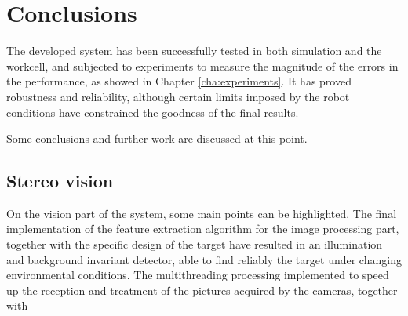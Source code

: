 
\chapter{Conclusions} %
\label{cha:conclusions}
The developed system has been successfully tested in both simulation and the workcell, and subjected to experiments to measure the magnitude of the errors in the performance, as showed in Chapter \ref{cha:experiments}.
It has proved robustness and reliability, although certain limits imposed by the robot conditions have constrained the goodness of the final results.

Some conclusions and further work are discussed at this point.

\section{Stereo vision}
On the vision part of the system, some main points can be highlighted.
The final implementation of the feature extraction algorithm for the image processing part, together with the specific design of the target have resulted in an illumination and background invariant detector, able to find reliably the target under changing environmental conditions.
The multithreading processing implemented to speed up the reception and treatment of the pictures acquired by the cameras, together with 

